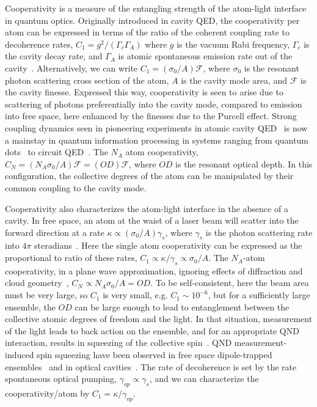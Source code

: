 \documentclass[preprint,aps,pra,onecolumn,superscriptaddress]{revtex4-1} %
\begin{document}
Cooperativity is a measure of the entangling strength of the atom-light interface in quantum optics.  Originally introduced in cavity QED, the cooperativity per atom can be expressed in terms of the ratio of the coherent coupling rate to decoherence rates, $C_1 = g^2/(\Gamma_c \Gamma_A)$ where $g$ is the vacuum Rabi frequency,  $\Gamma_c$ is the cavity decay rate, and $\Gamma_A$ is atomic spontaneous emission rate out of the cavity~\cite{Kimble1998}.  Alternatively, we can write $C_1 = (\sigma_0/A) \mathcal{F}$, where $\sigma_0$ is the resonant photon scattering cross section of the atom, $A$ is the cavity mode area, and $\mathcal{F}$ is the cavity finesse.  Expressed this way, cooperativity is seen to arise due to scattering of photons preferentially into the cavity mode, compared to emission into free space, here enhanced by the finesses due to the Purcell effect. Strong coupling dynamics seen in pioneering experiments in atomic cavity QED~\cite{Raimond2001Manipulating, Miller2005} is now a mainstay in quantum information processing in systems ranging from quantum dots~\cite{Akimov2007, Akopian2006, Liu2010} to circuit QED~\cite{Wallraff2004Strong, Hofheinz2009Synthesizing}.  The $N_A$ atom cooperativity, $C_N = (N_A \sigma_0/A) \mathcal{F} =( OD) \mathcal{F}$, where $OD$ is the resonant optical depth.  In this configuration, the collective degrees of the atom can be manipulated by their common coupling to the cavity mode.

Cooperativity also characterizes the atom-light interface in the absence of a cavity.  In free space, an atom at the waist of a laser beam will scatter into the forward direction at a rate $\kappa \propto (\sigma_0/A) \gamma_s$, where $\gamma_s$ is the photon scattering rate into $4 \pi$ steradians~\cite{Baragiola2014}.  Here the single atom cooperativity can be expressed as the proportional to ratio of these rates, $C_1 \propto \kappa/\gamma_s \propto \sigma_0/A$.  The $N_A$-atom cooperativity, in a plane wave approximation, ignoring effects of diffraction and cloud geometry~\cite{Baragiola2014}, $C_N \propto N_A \sigma_0/A = OD$.  To be self-consistent, here the beam area must be very large, so $C_1$ is very small, e.g. $C_1 \sim 10^{-6}$, but for a sufficiently large ensemble, the $OD$ can be large enough to lead to entanglement between the collective atomic degrees of freedom and the light.  In that situation, measurement of the light leads to back action on the ensemble, and for an appropriate QND interaction, results in squeezing of the collective spin~\cite{Kuzmich1998, Takahashi1999Quantum}. QND measurement-induced spin squeezing have been observed in free space dipole-trapped ensembles~\cite{Appel2009Mesoscopic, Takano2009Spin, Sewell2012Magnetic} and in optical cavities~\cite{Schleier-Smith2010States, Cox2016Deterministic, Hosten2016}. {\color{blue}  The rate of decoherence is set by the rate spontaneous optical pumping,  $\gamma_{op} \propto \gamma_s$, and we can characterize the cooperativity/atom by $C_1 = \kappa/\gamma_{op}$.}
\end{document}
